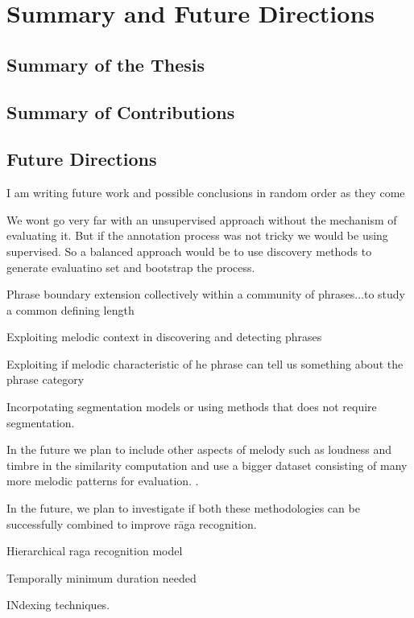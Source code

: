 
\chapter{Summary and Future Directions}
\label{sec:summary_future_work}

\section{Summary of the Thesis}
\section{Summary of Contributions}
\section{Future Directions}



I am writing future work and possible conclusions in random order as they come 

We wont go very far with an unsupervised approach without the mechanism of evaluating it. But if the annotation process was not tricky we would be using supervised. So a balanced approach would be to use discovery methods to generate evaluatino set and bootstrap the process. 

Phrase boundary extension collectively within a community of phrases...to study a common defining length

Exploiting melodic context in discovering and detecting phrases

Exploiting if melodic characteristic of he phrase can tell us something about the phrase category

Incorpotating segmentation models or using methods that does not require segmentation.

In the future we plan to include other aspects of melody such as loudness and timbre in the similarity computation and use a bigger dataset consisting of many more melodic patterns for evaluation.
.

In the future, we plan to investigate if both these methodologies can be successfully combined to improve r\={a}ga recognition.

Hierarchical raga recognition model

Temporally minimum duration needed

INdexing techniques.